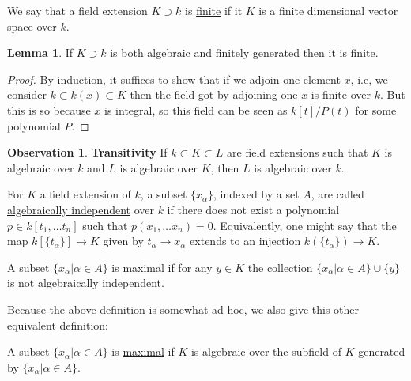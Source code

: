 \documentclass[12 pt]{article}
\theoremstyle{definition}
\newtheorem{lemma}[theorem]{Lemma}
\newtheorem{obs}[theorem]{Observation}
\begin{document}
\begin{definition} We say that a field extension $K \supset k$ is \underline{finite} if it $K$ is a finite dimensional vector space over $k$.
\end{definition}

\begin{lemma} If $K \supset k$ is both algebraic and finitely generated then it is finite.
\end{lemma}
\begin{proof} By induction, it suffices to show that if we adjoin one element $x$, i.e, we consider $k \subset k(x) \subset K$ then the field got by adjoining one $x$ is finite over $k$. But this is so because $x$ is integral, so this field can be seen as $k[t]/P(t)$ for some polynomial $P$.
\end{proof}

\begin{obs} \textbf{Transitivity} If $k \subset K \subset L$ are field extensions such that $K$ is algebraic over $k$ and $L$ is algebraic over $K$, then $L$ is algebraic over $k$.
\end{obs}

\begin{definition} For $K$ a field extension of $k$, a subset $\{x_\alpha\}$, indexed by a set $A$, are called \underline{algebraically independent} over $k$ if there does not exist a polynomial $p \in k[t_1, \ldots t_n]$ such that $p(x_1, \ldots x_n)=0$. Equivalently, one might say that the map $k[\{t_\alpha\}] \to K$ given by $t_\alpha \to x_\alpha$ extends to an injection $k(\{t_\alpha\}) \to K$.
\end{definition}

\phantom{\textcolor[rgb]{0.98,0.00,0.00}{Question: does the above $A$ need to be finite?}}

\begin{definition} A subset $\{x_\alpha| \alpha \in A\}$ is \underline{maximal} if for any $y \in K$ the collection $\{x_\alpha|\alpha \in A\} \cup \{y\}$ is not algebraically independent.
\end{definition}

Because the above definition is somewhat ad-hoc, we also give this other equivalent definition:

\begin{definition} A subset $\{x_\alpha| \alpha \in A\}$ is \underline{maximal} if $K$ is algebraic over the subfield of $K$ generated by $\{x_\alpha| \alpha \in A\}$.
\end{definition}
\end{document}
